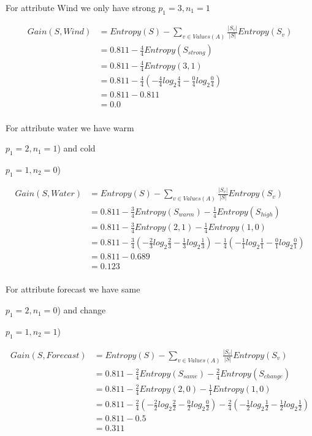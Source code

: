 \documentclass[10pt,a4paper]{article}
\begin{document}
{{{{{{For attribute Wind we only have strong {$p_1=3,n_1=1$}

\begin{equation}
\begin{split}
\label{wind}
Gain(S,Wind) &= Entropy(S) - \sum_{v \in Values(A)} \frac{\vert S_v\vert}{\vert S\vert}Entropy(S_v) \\
          &= 0.811 - \frac{4}{4} Entropy(S_{strong} ) \\
          &= 0.811 - \frac{4}{4} Entropy(3,1) \\
          &= 0.811 -\frac{4}{4} ( -\frac{4}{4} log_2\frac{4}{4} -\frac{0}{4} log_2\frac{0}{4} ) \\
          &= 0.811 - 0.811\\
          &= 0.0 \\
\end{split}
\end{equation}

For attribute water we have warm {$p_1=2,n_1=1$) and cold {$p_1=1,n_2=0$)

\begin{equation}
\begin{split}
\label{water}
Gain(S,Water) &= Entropy(S) - \sum_{v \in Values(A)} \frac{\vert S_v\vert}{\vert S\vert}Entropy(S_v) \\
          &= 0.811 - \frac{3}{4} Entropy(S_{warm} ) - \frac{1}{4}Entropy(S_{high}) \\
          &= 0.811 - \frac{3}{4} Entropy(2,1) - \frac{1}{4}Entropy(1,0) \\
          &= 0.811 -\frac{3}{4} ( -\frac{2}{3} log_2\frac{2}{3} -\frac{1}{3} log_2\frac{1}{3} ) - \frac{1}{4}(-\frac{1}{1} log_2\frac{1}{1} - \frac{0}{1}log_2\frac{0}{1} ) \\
          &= 0.811 - 0.689\\
          &= 0.123 \\
\end{split}
\end{equation}

For attribute forecast we have same {$p_1=2,n_1=0$) and change {$p_1=1,n_2=1$)

\begin{equation}
\begin{split}
\label{forcast}
Gain(S,Forecast) &= Entropy(S) - \sum_{v \in Values(A)} \frac{\vert S_v\vert}{\vert S\vert}Entropy(S_v) \\
          &= 0.811 - \frac{2}{4} Entropy(S_{same} ) - \frac{2}{4}Entropy(S_{change}) \\
          &= 0.811 - \frac{2}{4} Entropy(2,0) - \frac{1}{1}Entropy(1,0) \\
          &= 0.811 -\frac{2}{4} ( -\frac{2}{2} log_2\frac{2}{2} -\frac{0}{2} log_2\frac{0}{2} ) - \frac{2}{4}(-\frac{1}{2} log_2\frac{1}{2} - \frac{1}{2}log_2\frac{1}{2} ) \\
          &= 0.811 - 0.5\\
          &= 0.311 \\
\end{split}
\end{equation}

}}}}}}}}}}
\end{document}
